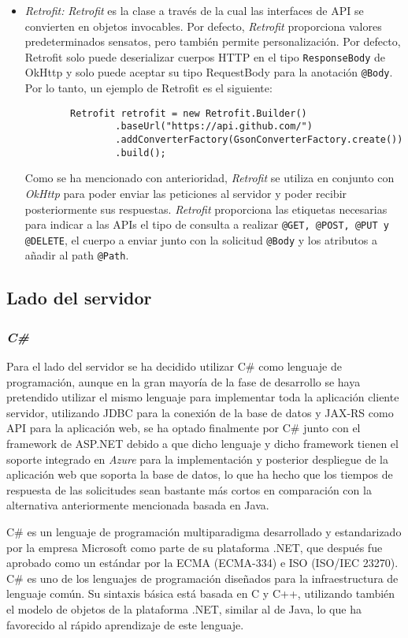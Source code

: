 \begin{itemize}
    \item \textit{Retrofit: }\textit{Retrofit }es la clase a través de la cual las
    interfaces de API se convierten en objetos invocables. Por defecto, \textit{Retrofit}
    proporciona valores predeterminados sensatos, pero también permite
    personalización. Por defecto, Retrofit solo puede deserializar cuerpos HTTP
    en el tipo \texttt{ResponseBody} de OkHttp y solo puede aceptar su tipo RequestBody
    para la anotación \texttt{@Body}. Por lo tanto, un ejemplo de Retrofit es el siguiente:
    \begin{lstlisting}
        Retrofit retrofit = new Retrofit.Builder()
                .baseUrl("https://api.github.com/")
                .addConverterFactory(GsonConverterFactory.create())
                .build();
    \end{lstlisting}
    Como se ha mencionado con anterioridad, \textit{Retrofit} se utiliza en
    conjunto con \textit{OkHttp} para poder enviar las peticiones al servidor y
    poder recibir posteriormente sus respuestas. \textit{Retrofit} proporciona
    las etiquetas necesarias para indicar a las APIs el tipo de consulta a
    realizar \texttt{@GET, @POST, @PUT y @DELETE}, el cuerpo a enviar junto con
    la solicitud \texttt{@Body} y los atributos a añadir al path \texttt{@Path}.
\end{itemize}
\subsection{Lado del servidor}
\subsubsection{\textit{C\#}} Para el lado del servidor se ha decidido utilizar
C\# como lenguaje de programación, aunque en la gran mayoría de la fase de
desarrollo se haya pretendido utilizar el mismo lenguaje para implementar toda
la aplicación cliente servidor, utilizando JDBC para la conexión de la base de
datos y JAX-RS como API para la aplicación web, se ha optado finalmente por C\#
junto con el framework de ASP.NET debido a que dicho lenguaje y dicho framework
tienen el soporte integrado en \textit{Azure} para la implementación y posterior
despliegue de la aplicación web que soporta la base de datos, lo que ha hecho
que los tiempos de respuesta de las solicitudes sean bastante más cortos en
comparación con la alternativa anteriormente mencionada basada en Java.

C\# es un lenguaje de programación multiparadigma desarrollado y estandarizado
por la empresa Microsoft como parte de su plataforma .NET, que después fue
aprobado como un estándar por la ECMA (ECMA-334) e ISO (ISO/IEC 23270). C\# es
uno de los lenguajes de programación diseñados para la infraestructura de
lenguaje común. Su sintaxis básica está basada en C y C++, utilizando también el
modelo de objetos de la plataforma .NET, similar al de Java, lo que ha
favorecido al rápido aprendizaje de este lenguaje.\cite{CSharp}


